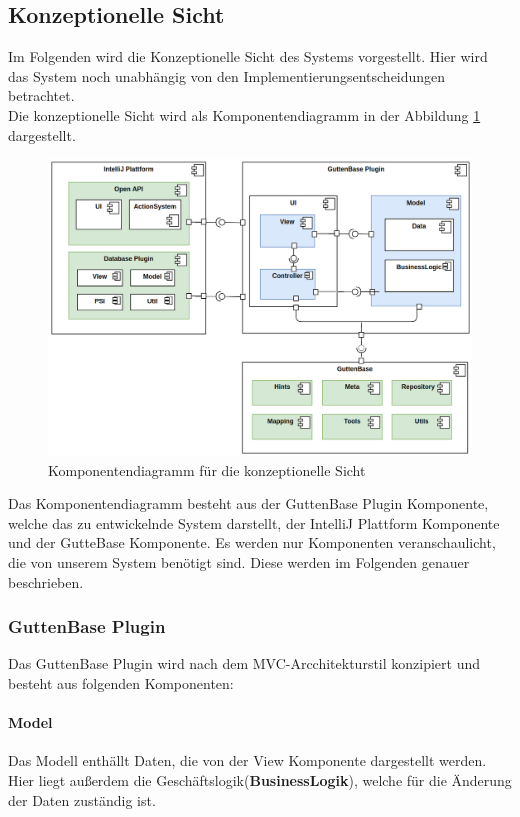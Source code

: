 \subsection{Konzeptionelle Sicht}
Im Folgenden wird die Konzeptionelle Sicht des Systems vorgestellt. Hier wird das System noch unabhängig von den Implementierungsentscheidungen betrachtet. \\
Die konzeptionelle Sicht wird als Komponentendiagramm in der Abbildung \ref{img:component-diagram} dargestellt. 
\begin{figure}[H]
	\centering
	\includegraphics[width=\textwidth]{images/sichten/component-diagram}
	\caption{Komponentendiagramm für die konzeptionelle Sicht}
	\label{img:component-diagram}
\end{figure}
Das Komponentendiagramm besteht aus der GuttenBase Plugin Komponente, welche das zu entwickelnde System darstellt, der IntelliJ Plattform Komponente und der GutteBase Komponente. Es werden nur Komponenten veranschaulicht, die von unserem System benötigt sind. Diese werden im Folgenden genauer beschrieben.


\subsubsection{GuttenBase Plugin}
Das GuttenBase Plugin wird nach dem MVC-Arcchitekturstil konzipiert und besteht aus folgenden Komponenten:

\paragraph*{Model}
Das Modell enthällt Daten, die von der View Komponente dargestellt werden. Hier liegt außerdem die Geschäftslogik(\textbf{BusinessLogik}), welche für die Änderung der Daten zuständig ist.

